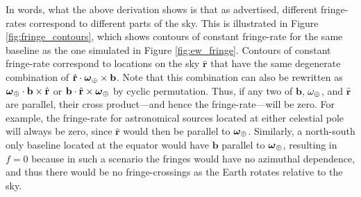 \documentclass[twocolumn,apj,numberedappendix]{emulateapj}
\newcommand{\rhat}{\hat{\mathbf{r}}}
\begin{document}
In words, what the above derivation shows is that as advertised, different fringe-rates correspond to different parts of the sky. This is illustrated in Figure \ref{fig:fringe_contours}, which shows contours of constant fringe-rate for the same baseline as the one simulated in Figure \ref{fig:ew_fringe}. Contours of constant fringe-rate correspond to locations on the sky $\rhat$ that have the same degenerate combination of $\rhat \cdot \boldsymbol \omega_\Earth \times \mathbf{b} $. Note that this combination can also be rewritten as $\boldsymbol \omega_\Earth \cdot \mathbf{b} \times \rhat $ or $\mathbf{b} \cdot \rhat \times  \boldsymbol \omega_\Earth $ by cyclic permutation. Thus, if any two of $\mathbf{b}$, $\omega_\oplus$, and $\rhat$ are parallel, their cross product---and hence the fringe-rate---will be zero. For example, the fringe-rate for astronomical sources located at either celestial pole will always be zero, since $\rhat$ would then be parallel to $\boldsymbol \omega_\oplus$. Similarly, a north-south only baseline located at the equator would have $\mathbf{b}$ parallel to $\boldsymbol \omega_\oplus$, resulting in $f=0$ because in such a scenario the fringes would have no azimuthal dependence, and thus there would be no fringe-crossings as the Earth rotates relative to the sky.
\end{document}

